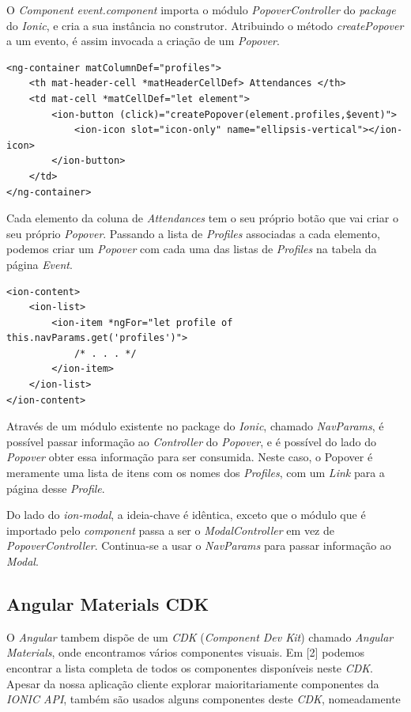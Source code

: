 O \textit{Component event.component} importa o módulo \textit{PopoverController} do \textit{package} do \textit{Ionic}, e cria a sua instância no construtor. Atribuindo o método \textit{createPopover} a um evento, é assim invocada a criação de um \textit{Popover}. 

\begin{lstlisting}
<ng-container matColumnDef="profiles">
	<th mat-header-cell *matHeaderCellDef> Attendances </th>
	<td mat-cell *matCellDef="let element">
		<ion-button (click)="createPopover(element.profiles,$event)">
			<ion-icon slot="icon-only" name="ellipsis-vertical"></ion-icon>
		</ion-button>
	</td>
</ng-container>
\end{lstlisting}



Cada elemento da coluna de \textit{Attendances} tem o seu próprio botão que vai criar o seu próprio \textit{Popover}. Passando a lista de \textit{Profiles} associadas a cada elemento, podemos criar um \textit{Popover} com cada uma das listas de \textit{Profiles} na tabela da página \textit{Event}.\\

\begin{lstlisting}
<ion-content>
	<ion-list>
		<ion-item *ngFor="let profile of this.navParams.get('profiles')">
			/* . . . */
		</ion-item>
	</ion-list>
</ion-content>
\end{lstlisting}

Através de um módulo existente no package do \textit{Ionic}, chamado \textit{NavParams}, é possível passar informação ao \textit{Controller} do \textit{Popover}, e é possível do lado do \textit{Popover} obter essa informação para ser consumida. Neste caso, o Popover é meramente uma lista de itens com os nomes dos \textit{Profiles}, com um \textit{Link} para a página desse \textit{Profile}.

Do lado do \textit{ion-modal}, a ideia-chave é idêntica, exceto que o módulo que é importado pelo \textit{component} passa a ser o \textit{ModalController} em vez de \textit{PopoverController}. Continua-se a usar o \textit{NavParams} para passar informação ao \textit{Modal}.

\subsection{Angular Materials CDK}

O \textit{Angular} tambem dispõe de um \textit{CDK} (\textit{Component Dev Kit}) chamado \textit{Angular Materials}, onde encontramos vários componentes visuais. Em [2] podemos encontrar a lista completa de todos os componentes disponíveis neste \textit{CDK}. Apesar da nossa aplicação cliente explorar maioritariamente componentes da \textit{IONIC API}, também são usados alguns componentes deste \textit{CDK}, nomeadamente\\

